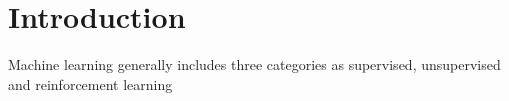 \section{Introduction}

Machine learning generally includes three categories as supervised, unsupervised and reinforcement learning
